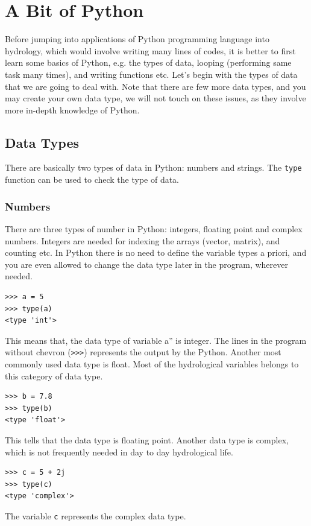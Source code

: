 \documentclass[10pt]{book}
\begin{document}
{\chapter{A Bit of Python}
Before jumping into applications of Python programming language into hydrology, 
which would involve writing many lines of codes, it is better to first learn some basics 
of Python, e.g. the types of data, looping (performing same task many times), 
and writing functions etc. Let's begin with the types of data that we are going to deal
with. Note that there are few more data types, and you may create your own data type,
we will not touch on these issues, as they involve more in-depth knowledge of Python. \\ 

\section{Data Types}
There are basically two types of data in Python: numbers and strings. 
The \verb"type" function can be used to check the type of data. \\

\subsection{Numbers}
There are three types of number in Python: integers, floating point and complex numbers. 
Integers are needed for indexing the arrays (vector, matrix), and counting etc. 
In Python there is no need to define the variable types a priori, and you are even allowed to 
change the data type later in the program, wherever needed. 
\beforeverb \begin{verbatim}
>>> a = 5
>>> type(a)
<type 'int'>
\end{verbatim} \afterverb

This means that, the data type of variable \verb``a'' is integer. 
The lines in the program without chevron (\verb">>>") represents the output by the Python. 
Another most commonly used data type is float. Most of the hydrological variables belongs to 
this category of data type. 
\beforeverb
\begin{verbatim}
>>> b = 7.8
>>> type(b)
<type 'float'>
\end{verbatim}
\afterverb
This tells that the data type is floating point. Another data type is complex, which is not 
frequently needed in day to day hydrological life. 
\beforeverb
\begin{verbatim}
>>> c = 5 + 2j
>>> type(c)
<type 'complex'>
\end{verbatim}
\afterverb
The variable \verb"c" represents the complex data type.

}
\end{document}
